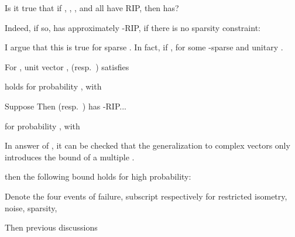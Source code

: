 {
\I Is it true that if , , , and  all have RIP, then  has?

\I Indeed, if so,  has approximately -RIP, if there is no sparsity constraint:

\I I argue that this is true for sparse .
In fact, if , for some -sparse  and unitary .

}
{
\I For , unit vector ,  (resp.\ ) satisfies
%

\I holds for probability , with
}
{
\I Suppose
%
%
\I Then  (resp.\ ) has -RIP...

\I for probability , with
}
{
\I In answer of , it can be checked that the generalization to complex vectors only introduces the bound of a multiple .

\I then the following bound holds for high probability:

}
{
\I Denote the four events of failure, subscript respectively for restricted isometry, noise, sparsity,

\I Then previous discussions
}
